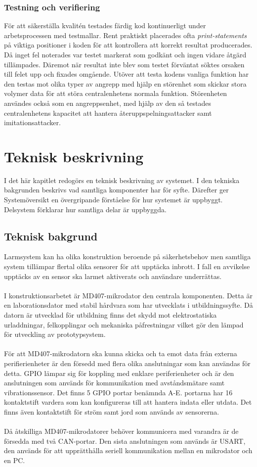 \documentclass{article}
\begin{document}
\subsubsection{Testning och verifiering}
För att säkerställa kvalitén testades färdig kod kontinuerligt under arbetsprocessen med testmallar.
Rent praktiskt placerades ofta \emph{print-statements} på viktiga positioner i koden för att kontrollera att korrekt resultat producerades.
Då inget fel noterades var testet markerat som godkänt och ingen vidare åtgärd tillämpades. 
Däremot när resultat inte blev som testet förväntat söktes orsaken till felet upp och fixades omgående.
Utöver att testa kodens vanliga funktion har den testas mot olika typer av angrepp med hjälp en störenhet som skickar stora volymer data för att störa centralenhetens normala funktion. 
Störenheten användes också som en angreppsenhet, med hjälp av den så testades centralenhetens kapacitet att hantera återuppspelningsattacker samt imitationsattacker.

\section{Teknisk beskrivning}
I det här kapitlet redogörs en teknisk beskrivning av systemet. 
I den tekniska bakgrunden beskrivs vad samtliga komponenter har för syfte. Därefter ger Systemöversikt en övergripande förståelse för hur systemet är uppbyggt. 
Delsystem förklarar hur samtliga delar är uppbyggda.

\subsection{Teknisk bakgrund}
Larmsystem kan ha olika konstruktion beroende på säkerhetsbehov men samtliga system tillämpar flertal olika sensorer för att upptäcka inbrott. 
I fall en avvikelse upptäcks av en sensor ska larmet aktiverats och användare underrättas.
\\
\\
I konstruktionsarbetet är MD407-mikrodator den centrala komponenten. 
Detta är en laborationsdator med stabil hårdvara som har utvecklats i utbildningssyfte. 
Då datorn är utvecklad för utbildning finns det skydd mot elektrostatiska urladdningar, felkopplingar och mekaniska påfrestningar vilket gör den lämpad för utveckling av prototypsystem.
\\
\\
För att MD407-mikrodatorn ska kunna skicka och ta emot data från externa perifierienheter är den försedd med flera olika anslutningar som kan användas för detta. 
GPIO lämpar sig för koppling med enklare periferienheter och är den anslutningen som används för kommunikation med avståndsmätare samt vibrationssensor. 
Det finns 5 GPIO portar benämnda A-E. portarna har 16 kontaktstift vardera som kan konfigureras till att hantera indata eller utdata. 
Det finns även kontaktstift för ström samt jord som används av sensorerna.\\
\\
Då åtskilliga MD407-mikrodatorer behöver kommunicera med varandra är de försedda med två CAN-portar. Den sista anslutningen som används är USART, den används för att upprätthålla seriell kommunikation mellan en mikrodator och en PC.
\end{document}

